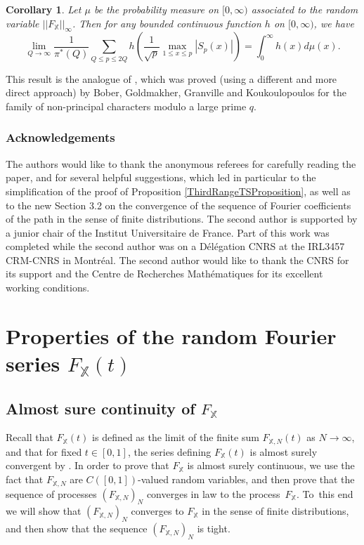 \documentclass[JEP,XML,SOM,Unicode,NoFloatCountersInSection,published]{cedram}
\theoremstyle{plain}
\newtheorem{cor}[thm]{Corollary}
\theoremstyle{definition}
\newcommand{\X}{\mathbb{X}}
\begin{document}
\begin{cor}\label{Cor: Distribution Maximum} Let $\mu$ be the probability measure on $[0, \infty)$ associated to the random variable $||F_{\X}||_{\infty}$. Then for any bounded
continuous function $h$ on $[0, \infty)$, we have
\[
\lim_{Q \to \infty} \frac{1}{\pi^*(Q)}\sum_{Q\leq p\leq 2Q} h\left(\frac{1}{\sqrt{p}}\max_{1\leq x\leq p} |S_p(x)|\right)= \int_0^{\infty} h(x) d\mu (x).\]
\end{cor}
This result is the analogue of \cite[Th.\,1.4]{BGGK}, which was proved (using a different and more direct approach) by Bober, Goldmakher, Granville and Koukoulopoulos for the family of non-principal characters modulo a large prime $q$.

\subsubsection*{Acknowledgements} The authors would like to thank the anonymous referees for carefully reading the paper, and for several helpful suggestions, which led in particular to the simplification of the proof of Proposition \ref{ThirdRangeTSProposition}, as well as to the new Section 3.2 on the convergence of the sequence of Fourier coefficients of the path in the sense of finite distributions. The second author is supported by a junior chair of the Institut Universitaire de France. Part of this work was completed while the second author was on a Délégation CNRS at the IRL3457 CRM-CNRS in Montréal. The second author would like to thank the CNRS for its support and the Centre de Recherches Mathématiques for its excellent working conditions.

\section{Properties of the random Fourier series \texorpdfstring{$F_{\X}(t)$}{Ft}}\label{s: Random Fourier}

\subsection{Almost sure continuity of $F_{\X}$}

Recall that $F_{\X}(t)$ is defined as the limit of the finite sum $F_{\X, N}(t)$ as $N\to \infty$, and that for fixed $t\in [0, 1]$, the series defining $F_{\X}(t)$ is almost surely convergent by \cite[Lem.\,1]{Ka}. In order to prove that $F_{\X}$ is almost surely continuous, we use the fact that $F_{\X, N}$ are $C([0,1])$-valued random variables, and then prove that the sequence of processes $(F_{\X, N})_{N}$ converges in law to the process~$F_{\X}$. To~this end we will show that $(F_{\X, N})_{N}$ converges to $F_{\X}$ in the sense of finite distributions, and then show that the sequence $(F_{\X, N})_{N}$ is tight.
\end{document}
